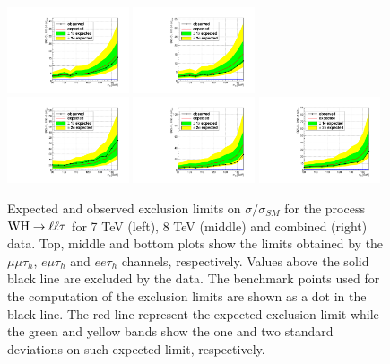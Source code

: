 \begin{figure}
\begin{center}
  \includegraphics[width=0.32\textwidth]{4_Analisys/pics/limits/emt/emt_8TeV.pdf}
  \includegraphics[width=0.32\textwidth]{4_Analisys/pics/limits/emt/emt.pdf} \\
  \includegraphics[width=0.32\textwidth]{4_Analisys/pics/limits/eet/eet_7TeV.pdf}
  \includegraphics[width=0.32\textwidth]{4_Analisys/pics/limits/eet/eet_8TeV.pdf}
  \includegraphics[width=0.32\textwidth]{4_Analisys/pics/limits/eet/eet.pdf} \\
  \caption{Expected and observed exclusion limits on $\sigma/\sigma_{SM}$ for the process $\mathrm{W}\mathrm{H} \rightarrow \ell \ell \tau$ for 7 TeV (left), 8 TeV (middle) and combined (right) data. Top, middle and bottom plots show the limits obtained by the $\mu\mu\tau_h$, $e\mu\tau_h$ and $ee\tau_h$ channels, respectively. Values above the solid black line are excluded by the data. The benchmark points used for the computation of the exclusion limits are shown as a dot in the black line. The red line represent the expected exclusion limit while the green and yellow bands show the one and two standard deviations on such expected limit, respectively.}
  \label{fig:llt_chan_limits}
\end{center}
\end{figure}

